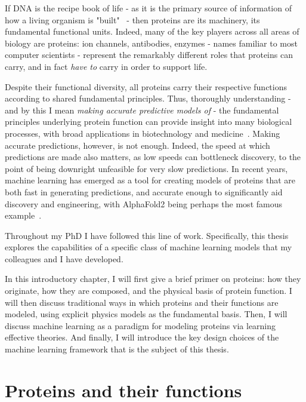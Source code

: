 
If DNA is the recipe book of life - as it is the primary source of information of
how a living organism is "built"~\citep{alberts_molecular_2002} - then proteins are its machinery, its fundamental functional units.
Indeed, many of the key players across all areas of biology are proteins: ion channels, antibodies, enzymes
- names familiar to most computer scientists - represent the remarkably different roles that proteins can carry,
and in fact \textit{have to} carry in order to support life.

Despite their functional diversity, all proteins carry their respective functions according to shared
fundamental principles. Thus, thoroughly understanding - and by this I mean \textit{making accurate predictive models of} -
the fundamental principles underlying protein function can provide insight into many biological processes,
with broad applications in biotechnology and medicine~\citep{mclellan_structure-based_2013, wang_d3distalmutation_2021, hie_efficient_2024}.
Making accurate predictions, however, is not enough. Indeed, the speed at which predictions are made also
matters, as low speeds can bottleneck discovery, to the point of being downright unfeasible for very slow
predictions.
In recent years, machine learning has emerged as a tool for creating models of proteins that are both fast
in generating predictions, and accurate enough to significantly aid discovery and engineering, with AlphaFold2 being
perhaps the most famous example~\citep{jumper_highly_2021}.

Throughout my PhD I have followed this line of work. Specifically, this thesis explores the capabilities
of a specific class of machine learning models that my colleagues and I have developed.

In this introductory chapter, I will first give a brief primer on proteins: how they originate, how they are composed,
and the physical basis of protein function.
I will then discuss traditional ways in which proteins and their functions are modeled, using explicit physics
models as the fundamental basis.
Then, I will discuss machine learning as a paradigm for modeling proteins via learning effective theories.
And finally, I will introduce the key design choices of the machine learning framework that is the subject of this thesis.



\section{Proteins and their functions}

